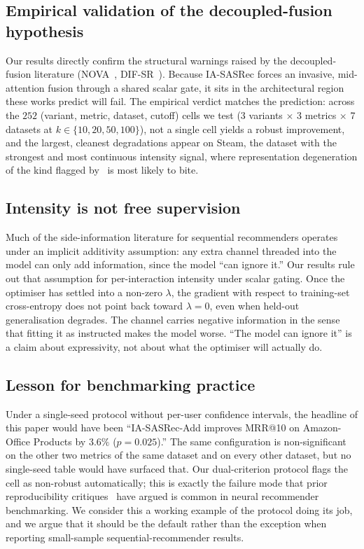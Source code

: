 \subsection{Empirical validation of the decoupled-fusion hypothesis}

Our results directly confirm the structural warnings raised by the
decoupled-fusion literature (NOVA~\citep{liu2021novabert},
DIF-SR~\citep{xie2022difsr}). Because IA-SASRec forces an invasive,
mid-attention fusion through a shared scalar gate, it sits in the
architectural region these works predict will fail. The empirical
verdict matches the prediction: across the $252$ (variant, metric,
dataset, cutoff) cells we test (3 variants $\times$ 3 metrics
$\times$ 7 datasets at $k\in\{10, 20, 50, 100\}$), not a single cell
yields a robust improvement, and the largest, cleanest degradations
appear on Steam, the dataset with the strongest and most continuous
intensity signal, where representation degeneration of the kind
flagged by~\citep{fan2022stosa,qiu2022duorec} is most likely to bite.

\subsection{Intensity is not free supervision}

Much of the side-information literature for sequential recommenders
operates under an implicit additivity assumption: any extra channel
threaded into the model can only add information, since the model
``can ignore it.'' Our results rule out that assumption for
per-interaction intensity under scalar gating. Once the optimiser has
settled into a non-zero $\lambda$, the gradient with respect to
training-set cross-entropy does not point back toward $\lambda{=}0$,
even when held-out generalisation degrades. The channel carries
negative information in the sense that fitting it as instructed
makes the model worse. ``The model can ignore it'' is a claim about
expressivity, not about what the optimiser will actually do.

\subsection{Lesson for benchmarking practice}

Under a single-seed protocol without per-user confidence intervals,
the headline of this paper would have been ``IA-SASRec-Add improves
MRR@10 on Amazon-Office Products by $3.6\%$ ($p{=}0.025$).'' The same
configuration is non-significant on the other two metrics of the same
dataset and on every other dataset, but no single-seed table would
have surfaced that. Our dual-criterion protocol flags the cell as
non-robust automatically; this is exactly the failure mode that prior
reproducibility critiques~\citep{ferrari2019,sun2020daisy} have argued
is common in neural recommender benchmarking. We consider this a
working example of the protocol
doing its job, and we argue that it should be the default rather than
the exception when reporting small-sample sequential-recommender
results.

